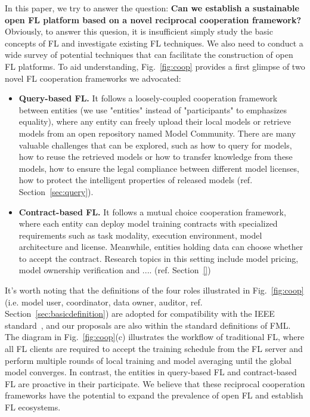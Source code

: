 In this paper, we try to answer the question: \textbf{Can we establish a sustainable open FL platform based on a novel reciprocal cooperation framework?}
Obviously, to answer this quesion, it is insufficient simply study the basic concepts of FL and investigate existing FL techniques.
We also need to conduct a wide survey of potential techniques that can facilitate the construction of open FL platforms.
To aid understanding, Fig.~\ref{fig:coop} provides a first glimpse of two novel FL cooperation frameworks we advocated: 
\begin{itemize}
    \item \textbf{Query-based FL.} It follows a loosely-coupled cooperation framework between entities (we use "entities" instead of "participants" to emphasizes equality), where any entity can freely upload their local models or retrieve models from an open repository named Model Community.
    There are many valuable challenges that can be explored, such as how to query for models, how to reuse the retrieved models or how to transfer knowledge from these models, how to ensure the legal compliance between different model licenses, how to protect the intelligent properties of released models (ref. Section~\ref{sec:query}). %
    \item \textbf{Contract-based FL.} It follows a mutual choice cooperation framework, where each entity can deploy model training contracts with specialized requirements such as task modality, execution environment, model architecture and license. Meanwhile, entities holding data can choose whether to accept the contract.
    Research topics in this setting include model pricing, model ownership verification and .... (ref. Section~\ref{}) %
\end{itemize}
It's worth noting that the definitions of the four roles illustrated in Fig.~\ref{fig:coop} (i.e. model user, coordinator, data owner, auditor, ref. Section~\ref{sec:basicdefinition}) are adopted for compatibility with the IEEE standard~\cite{IEEEstd3652}, and our proposals are also within the standard definitions of FML.
The diagram in Fig.~\ref{fig:coop}(c) illustrates the workflow of traditional FL, where all FL clients are required to accept the training schedule from the FL server and perform multiple rounds of local training and model averaging until the global model converges.
In contrast, the entities in query-based FL and contract-based FL are proactive in their participate.
We believe that these reciprocal cooperation frameworks have the potential to expand the prevalence of open FL and establish FL ecosystems.


